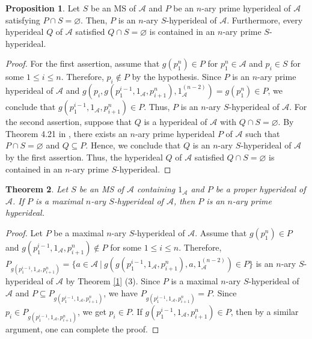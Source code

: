 \documentclass[preprint,review,10pt]{amsart}
\newtheorem{theorem}{Theorem}[section]
\theoremstyle{definition}
\newtheorem{proposition}[theorem]{Proposition}
\theoremstyle{remark}
\numberwithin{equation}{section}
\begin{document}
\begin{proposition} \label{2}
Let $S$ be an MS of $\mathscr{A}$ and $P$ be an $n$-ary prime hyperideal of $\mathscr{A}$ satisfying $P \cap S=\varnothing$. Then, $P$ is an $n$-ary $S$-hyperideal of $\mathscr{A}$. Furthermore, every hyperideal $Q$ of $\mathscr{A}$ satisfied $Q \cap S=\varnothing$ is contained in an $n$-ary prime $S$-hyperideal.
\end{proposition}
\begin{proof}
For the first assertion, assume that $g(p_1^n) \in P$ for $p_1^n \in \mathscr{A}$ and $p_i \in S$ for some $1 \leq i \leq n$. Therefore, $p_i \notin P$ by the hypothesis. Since $P$ is an $n$-ary prime hyperideal of $\mathscr{A}$ and  $g(p_i,g(p_1^{i-1},1_\mathscr{A},p_{i+1}^n),1_\mathscr{A}^{(n-2)})=g(p_1^n) \in P$, we conclude that $g(p_1^{i-1},1_\mathscr{A},p_{i+1}^n) \in P$. Thus, $P$ is an $n$-ary $S$-hyperideal of $\mathscr{A}$. For the second assertion, suppose that $Q$ is a hyperideal of  $\mathscr{A}$ with $Q \cap S=\varnothing$. By Theorem 4.21 in \cite{sorc1}, there exists an $n$-ary prime hyperideal $P$ of $\mathscr{A}$ such that $P \cap S=\varnothing $ and $Q \subseteq P$. Hence, we conclude that $Q$ is an $n$-ary $S$-hyperideal of $\mathscr{A}$ by the first assertion. Thus, the hyperideal $Q$ of $\mathscr{A}$ satisfied $Q \cap S=\varnothing$ is contained in an $n$-ary prime $S$-hyperideal.
\end{proof}
\begin{theorem} \label{7}
Let $S$ be an MS of  $\mathscr{A}$ containing $1_\mathscr{A} $ and  $P$ be a proper hyperideal  of  $\mathscr{A}$. If $P$ is a  maximal $n$-ary $S$-hyperideal of  $\mathscr{A}$, then $P$ is an $n$-ary prime hyperideal.
\end{theorem}
\begin{proof}
Let $P$ be a  maximal $n$-ary $S$-hyperideal of  $\mathscr{A}$. Assume that $g(p_1^n) \in P$ and $g(p_1^{i-1},1_\mathscr{A},p_{i+1}^n) \notin P$ for some $1 \leq i \leq n$. Therefore, $P_{g(p_1^{i-1},1_\mathscr{A},p_{i+1}^n)}=\{a \in \mathscr{A} \ \vert \ g(g(p_1^{i-1},1_\mathscr{A},p_{i+1}^n),a,1_\mathscr{A}^{(n-2)}) \in P \}$ is an $n$-ary $S$-hyperideal of $\mathscr{A}$ by Theorem \ref{1} (3). Since $P$ is a  maximal $n$-ary $S$-hyperideal of  $\mathscr{A}$ and $P \subseteq P_{g(p_1^{i-1},1_\mathscr{A},p_{i+1}^n)}$, we have $P_{g(p_1^{i-1},1_\mathscr{A},p_{i+1}^n)}=P$. Since  $p_i \in P_{g(p_1^{i-1},1_\mathscr{A},p_{i+1}^n)}$, we get $p_i \in P$. If $g(p_1^{i-1},1_\mathscr{A},p_{i+1}^n) \in P$, then by  a similar argument, one can complete the proof.
\end{proof}
\end{document}
